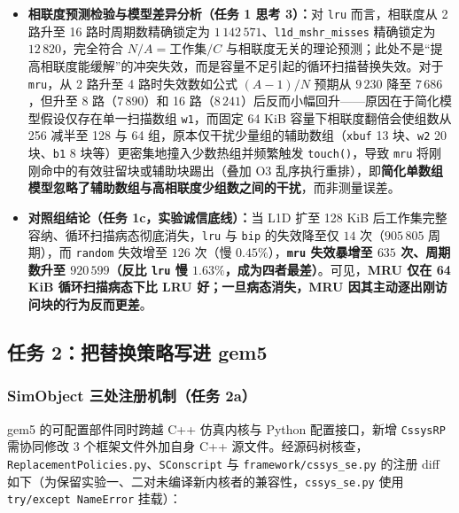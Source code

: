 \documentclass[12pt,a4paper,fontset=mac]{ctexart}
\begin{document}
\begin{itemize}
  \item \textbf{相联度预测检验与模型差异分析（任务 1 思考 3）：}对 \texttt{lru} 而言，相联度从 2 路升至 16 路时周期数精确锁定为 $1\,142\,571$、\texttt{l1d\_mshr\_misses} 精确锁定为 $12\,820$，完全符合 $N/A = \text{工作集}/C$ 与相联度无关的理论预测；此处不是“提高相联度能缓解”的冲突失效，而是容量不足引起的循环扫描替换失效。对于 \texttt{mru}，从 2 路升至 4 路时失效数如公式 $(A-1)/N$ 预期从 $9\,230$ 降至 $7\,686$，但升至 8 路（$7\,890$）和 16 路（$8\,241$）后反而小幅回升——原因在于简化模型假设仅存在单一扫描数组 \texttt{w1}，而固定 64 KiB 容量下相联度翻倍会使组数从 256 减半至 128 与 64 组，原本仅干扰少量组的辅助数组（\texttt{xbuf} 13 块、\texttt{w2} 20 块、\texttt{b1} 8 块等）更密集地撞入少数热组并频繁触发 \texttt{touch()}，导致 \texttt{mru} 将刚刚命中的有效驻留块或辅助块踢出（叠加 O3 乱序执行重排），即\textbf{简化单数组模型忽略了辅助数组与高相联度少组数之间的干扰}，而非测量误差。
  \item \textbf{对照组结论（任务 1c，实验诚信底线）：}当 L1D 扩至 128 KiB 后工作集完整容纳、循环扫描病态彻底消失，\texttt{lru} 与 \texttt{bip} 的失效降至仅 $14$ 次（$905\,805$ 周期），而 \texttt{random} 失效增至 $126$ 次（慢 $0.45\%$），\textbf{\texttt{mru} 失效暴增至 $635$ 次、周期数升至 $920\,599$（反比 \texttt{lru} 慢 $1.63\%$，成为四者最差）}。可见，\textbf{MRU 仅在 64 KiB 循环扫描病态下比 LRU 好；一旦病态消失，MRU 因其主动逐出刚访问块的行为反而更差}。
\end{itemize}

\subsection{任务 2：把替换策略写进 gem5}

\subsubsection{SimObject 三处注册机制（任务 2a）}
gem5 的可配置部件同时跨越 C++ 仿真内核与 Python 配置接口，新增 \texttt{CssysRP} 需协同修改 3 个框架文件外加自身 C++ 源文件。经源码树核查，\texttt{ReplacementPolicies.py}、\texttt{SConscript} 与 \texttt{framework/cssys\_se.py} 的注册 diff 如下（为保留实验一、二对未编译新内核者的兼容性，\texttt{cssys\_se.py} 使用 \texttt{try/except NameError} 挂载）：
\end{document}
